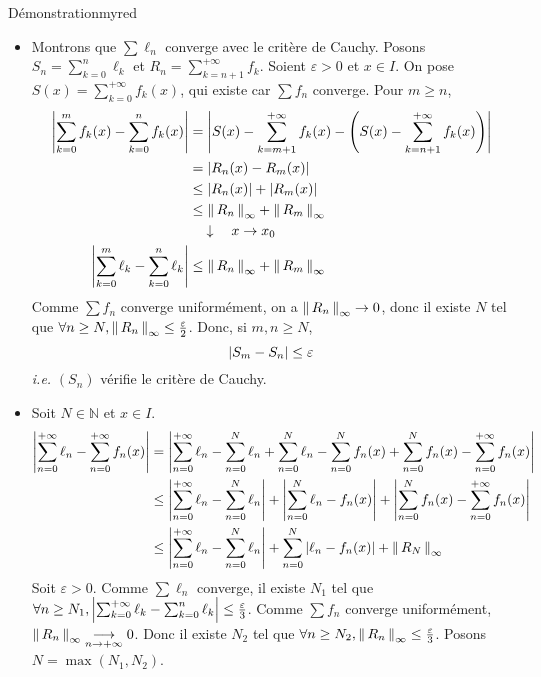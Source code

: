     \begin{demo}{Démonstration}{myred}
        \begin{itemize}
            \item Montrons que $\sum \ell_n$ converge avec le critère de Cauchy. Posons $S_n = \sum_{k=0}^{n} \ell_k$ et $R_n = \sum_{k=n+1}^{+\infty} f_k$. Soient $\varepsilon > 0$ et $x \in I$. On pose $S(x) = \sum_{k=0}^{+\infty} f_k(x)$, qui existe car $\sum f_n$ converge. Pour $m \geq n$, 
            \begin{align*}
                \left\lvert \sum_{k=0}^{m} f_k(x) - \sum_{k=0}^{n} f_k(x)\right\rvert 
                &= \left\lvert S(x)- \sum_{k=m+1}^{+\infty} f_k(x) - \left( S(x)- \sum_{k=n+1}^{+\infty} f_k(x) \right)\right\rvert \\
                &= \left\lvert R_n(x) - R_m(x)\right\rvert \\
                &\leq \left\lvert R_n(x)\right\rvert + \left\lvert R_m(x)\right\rvert \\
                &\leq \left\lVert\,R_n\,\right\rVert_{\infty} + \left\lVert\,R_m\,\right\rVert_{\infty} \\
                & \quad \downarrow \quad x \to x_0 \\
                \left\lvert \sum_{k=0}^{m} \ell_k - \sum_{k=0}^{n} \ell_k\right\rvert 
                &\leq \left\lVert\,R_n\,\right\rVert_{\infty} + \left\lVert\,R_m\,\right\rVert_{\infty} 
            \end{align*}
            Comme $\sum f_n$ converge uniformément, on a $\left\lVert\,R_n\,\right\rVert_{\infty} \to 0$, donc il existe $N$ tel que $\forall n \geq N, \left\lVert\,R_n\,\right\rVert_{\infty} \leq \frac{\varepsilon}{2}$. Donc, si $m,n \geq N$, 
            \[ \left\lvert S_m - S_n\right\rvert \leq \varepsilon \]   
            \textit{i.e.} $(S_n)$ vérifie le critère de Cauchy.
            \item Soit $N \in \mathbb{N}$ et $x \in I$.
            \begin{align*}
                \left\lvert \sum_{n=0}^{+\infty} \ell_n - \sum_{n=0}^{+\infty} f_n(x)\right\rvert
                & = \left\lvert \sum_{n=0}^{+\infty} \ell_n - \sum_{n=0}^{N} \ell_n + \sum_{n=0}^{N} \ell_n - \sum_{n=0}^{N}f_n(x) + \sum_{n=0}^{N}f_n(x) - \sum_{n=0}^{+\infty} f_n(x)\right\rvert \\
                & \leq \left\lvert \sum_{n=0}^{+\infty} \ell_n - \sum_{n=0}^{N} \ell_n\right\rvert + \left\lvert \sum_{n=0}^{N} \ell_n - f_n(x)\right\rvert + \left\lvert \sum_{n=0}^{N}f_n(x) - \sum_{n=0}^{+\infty} f_n(x)\right\rvert \\
                & \leq \left\lvert \sum_{n=0}^{+\infty} \ell_n - \sum_{n=0}^{N} \ell_n\right\rvert + \sum_{n=0}^{N} \left\lvert \ell_n - f_n(x)\right\rvert + \left\lVert\,R_N\,\right\rVert_{\infty}
            \end{align*}
            Soit $\varepsilon>0$. Comme $\sum \ell_n$ converge, il existe $N_1$ tel que $\forall n \geq N_1, \left\lvert \sum_{k=0}^{+\infty} \ell_k - \sum_{k=0}^{n} \ell_k\right\rvert \leq \frac{\varepsilon}{3} $. Comme $\sum f_n$ converge uniformément, $\left\lVert\,R_n\,\right\rVert_{\infty} \underset{n \rightarrow +\infty}{\longrightarrow} 0$. Donc il existe $N_2$ tel que $\forall n \geq N_2, \left\lVert\,R_n\,\right\rVert_{\infty} \leq \frac{\varepsilon}{3}$. Posons $N = \max(N_1, N_2)$.


\end{itemize}
\end{demo}
